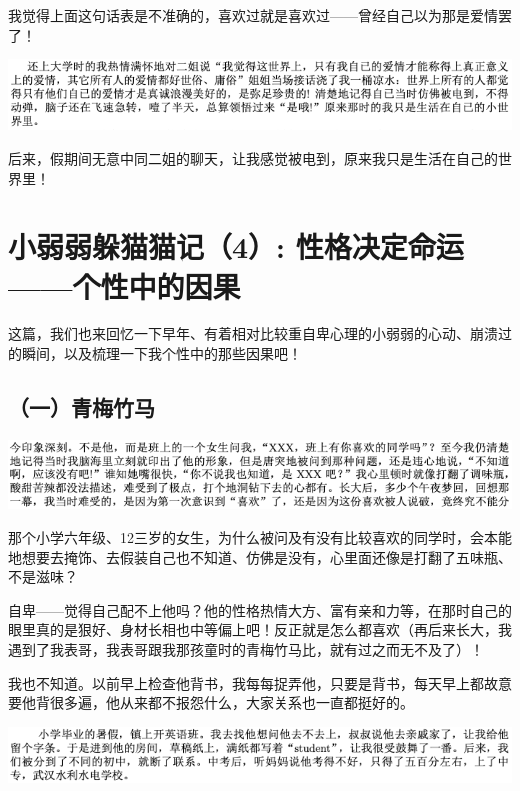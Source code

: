\documentclass[9pt, b5paper]{article}
\begin{document}
我觉得上面这句话表是不准确的，喜欢过就是喜欢过——曾经自己以为那是爱情罢了！

\begin{center}
\includegraphics[width=.9\linewidth]{./pic/backups_plans_20210422_182414.png}
\end{center}

后来，假期间无意中同二姐的聊天，让我感觉被电到，原来我只是生活在自己的世界里！

\section{小弱弱躲猫猫记（4）: 性格决定命运——个性中的因果}
\label{sec:org88868cc}

这篇，我们也来回忆一下早年、有着相对比较重自卑心理的小弱弱的心动、崩溃过的瞬间，以及梳理一下我个性中的那些因果吧！

\subsection{（一）青梅竹马}
\label{sec:org1f29a1f}

\begin{center}
\includegraphics[width=.9\linewidth]{./pic/backups_plans_20210422_105840.png}
\end{center}

那个小学六年级、12三岁的女生，为什么被问及有没有比较喜欢的同学时，会本能地想要去掩饰、去假装自己也不知道、仿佛是没有，心里面还像是打翻了五味瓶、不是滋味？

自卑——觉得自己配不上他吗？他的性格热情大方、富有亲和力等，在那时自己的眼里真的是狠好、身材长相也中等偏上吧！反正就是怎么都喜欢（再后来长大，我遇到了我表哥，我表哥跟我那孩童时的青梅竹马比，就有过之而无不及了）！

我也不知道。以前早上检查他背书，我每每捉弄他，只要是背书，每天早上都故意要他背很多遍，他从来都不报怨什么，大家关系也一直都挺好的。

\begin{center}
\includegraphics[width=.9\linewidth]{./pic/backups_plans_20210422_180800.png}
\end{center}
\end{document}
